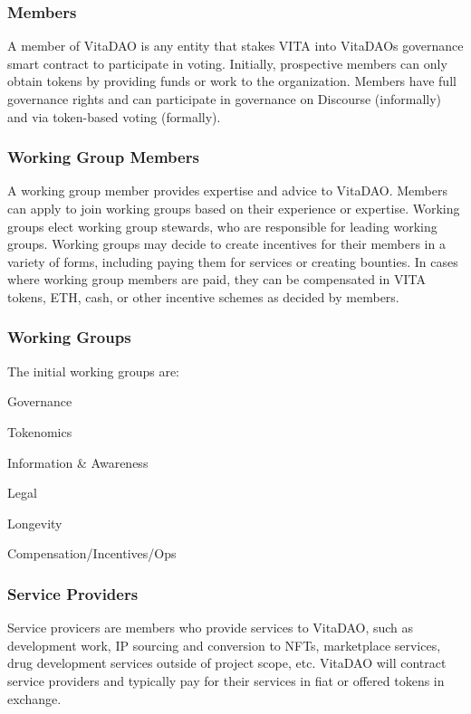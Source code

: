 \documentclass[10pt,letterpaper]{article}
\newenvironment{tight_enumerate}{
\begin{enumerate}
  \setlength{\itemsep}{0pt}
  \setlength{\parskip}{0pt}
}{\end{enumerate}}
\begin{document}
\subsubsection{Members}
A member of VitaDAO is any entity that stakes VITA into VitaDAOs governance smart contract to participate in voting. Initially, prospective members can only obtain tokens by providing funds or work to the organization. Members have full governance rights and can participate in governance on Discourse (informally) and via token-based voting (formally).

\subsubsection{Working Group Members}
A working group member provides expertise and advice to VitaDAO. Members can apply to join working groups based on their experience or expertise. Working groups elect working group stewards, who are responsible for leading working groups. Working groups may decide to create incentives for their members in a variety of forms, including paying them for services or creating bounties. In cases where working group members are paid, they can be compensated in VITA tokens, ETH, cash, or other incentive schemes as decided by members.

\subsubsection{Working Groups}

The initial working groups are: 
\begin{tight_enumerate}
\item Governance
\item Tokenomics
\item Information \& Awareness
\item Legal
\item Longevity
\item Compensation/Incentives/Ops
\end{tight_enumerate}

\subsubsection{Service Providers}
Service provicers are members who provide services to VitaDAO, such as development work, IP sourcing and conversion to NFTs, marketplace services, drug development services outside of project scope, etc. VitaDAO will contract service providers and typically pay for their services in fiat or offered tokens in exchange.
\end{document}

